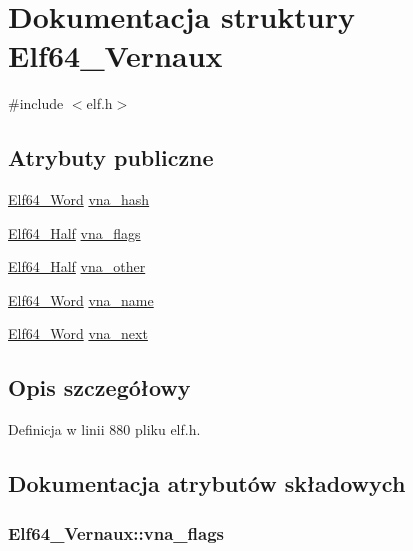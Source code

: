\hypertarget{struct_elf64___vernaux}{\section{Dokumentacja struktury Elf64\-\_\-\-Vernaux}
\label{struct_elf64___vernaux}
}


{\ttfamily \#include $<$elf.\-h$>$}

\subsection*{Atrybuty publiczne}
\begin{DoxyCompactItemize}
\item 
\hyperlink{elf_8h_aa3aa1920ed115b7ef7e99716fece4401}{Elf64\-\_\-\-Word} \hyperlink{struct_elf64___vernaux_ae41cce47b72e2232f3880843ab550649}{vna\-\_\-hash}
\item 
\hyperlink{elf_8h_adb6a5584018b431da3472e7c6a7fd731}{Elf64\-\_\-\-Half} \hyperlink{struct_elf64___vernaux_a1c5aa72ab842b4338ba2576d5f014700}{vna\-\_\-flags}
\item 
\hyperlink{elf_8h_adb6a5584018b431da3472e7c6a7fd731}{Elf64\-\_\-\-Half} \hyperlink{struct_elf64___vernaux_a56e3d7fee69c7b55556297757e1977e5}{vna\-\_\-other}
\item 
\hyperlink{elf_8h_aa3aa1920ed115b7ef7e99716fece4401}{Elf64\-\_\-\-Word} \hyperlink{struct_elf64___vernaux_a4c83e76a256ad7fe7058df7ee9493c5c}{vna\-\_\-name}
\item 
\hyperlink{elf_8h_aa3aa1920ed115b7ef7e99716fece4401}{Elf64\-\_\-\-Word} \hyperlink{struct_elf64___vernaux_a565bd1e8b3ae2f45854f8163629444fc}{vna\-\_\-next}
\end{DoxyCompactItemize}


\subsection{Opis szczegółowy}


Definicja w linii 880 pliku elf.\-h.



\subsection{Dokumentacja atrybutów składowych}
\hypertarget{struct_elf64___vernaux_a1c5aa72ab842b4338ba2576d5f014700}{
\subsubsection[{vna\-\_\-flags}]{ Elf64\-\_\-\-Vernaux\-::vna\-\_\-flags}}\label{struct_elf64___vernaux_a1c5aa72ab842b4338ba2576d5f014700}


